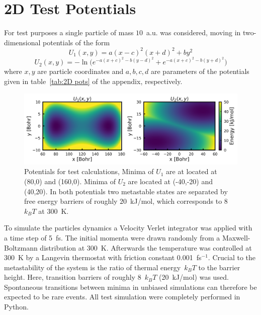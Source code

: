 \section{2D Test Potentials}
\label{sec:comp 2D}
For test purposes a single particle of mass $10$~a.u. was considered, moving in two-dimensional potentials of the form
\begin{equation}
  U_1(x,y) = a(x-c)^2(x+d)^2 + by^2 \label{eq:U1}
\end{equation}
\begin{equation}
  U_2(x,y) = -\ln\bigl( e^{-a(x+c)^2 - b(y-d)^2} + e^{-a(x+c)^2 - b(y+d)^2} \bigr) \label{eq:U2}
\end{equation}
where $x,y$ are particle coordinates and $a,b,c,d$ are parameters of the potentials given in table~\ref{tab:2D pots} of the appendix, respectively.
\begin{figure}[H]
    \centering
    \includegraphics[width=1.0\textwidth]{bilder/U}
    \caption{Potentials for test calculations, Minima of $U_1$ are at located at (80,0) and (160,0). Minima of $U_2$ are located at (-40,-20) and (40,20). In both potentials two metastable states are separated by free energy barriers of roughly $20$~kJ/mol, which corresponds to 8~$k_B T$ at 300~K.}
\label{fig:potentials}%
\end{figure}
To simulate the particles dynamics a Velocity Verlet\autocite{swope1982computer} integrator was applied with a time step of 5~fs.
The initial momenta were drawn randomly from a Maxwell-Boltzmann distribution at 300~K.
Afterwards the temperature was controlled at 300~K by a Langevin thermostat\autocite{kroger2005models} with friction constant 0.001~fs$^{-1}$.
Crucial to the metastability of the system is the ratio of thermal energy~$k_B T$ to the barrier height.
Here, transition barriers of roughly 8~$k_B T$ (20~kJ/mol) was used.
Spontaneous transitions between minima in unbiased simulations can therefore be expected to be rare events.
All test simulation were completely performed in Python.
\newpage
